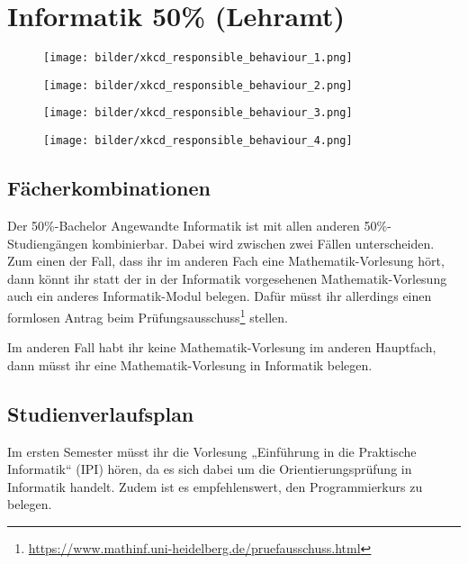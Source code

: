 \section{Informatik 50\% (Lehramt)}

\begin{figure*}[t]
    \centering
    \begin{subfigure}{.24\textwidth}
    		\centering
		\texttt{[image: bilder/xkcd\_responsible\_behaviour\_1.png]}
    \end{subfigure}
    \begin{subfigure}{.24\textwidth}
	    \centering
	    \texttt{[image: bilder/xkcd\_responsible\_behaviour\_2.png]}
    \end{subfigure}
    \begin{subfigure}{.25\textwidth}
	    \centering
	    \texttt{[image: bilder/xkcd\_responsible\_behaviour\_3.png]}
    \end{subfigure}
    \begin{subfigure}{.25\textwidth}
	    \centering
	    \texttt{[image: bilder/xkcd\_responsible\_behaviour\_4.png]}
    \end{subfigure}
\end{figure*}

\subsection{Fächerkombinationen}
Der 50\%-Bachelor Angewandte Informatik ist mit allen anderen 50\%-Studiengängen kombinierbar. Dabei wird zwischen zwei Fällen unterscheiden. Zum einen der Fall, dass ihr im anderen Fach eine Mathematik-Vorlesung hört, dann könnt ihr statt der in der Informatik vorgesehenen Mathematik-Vorlesung auch ein anderes Informatik-Modul belegen. Dafür müsst ihr allerdings einen formlosen Antrag beim Prüfungsausschuss\footnote{\url{https://www.mathinf.uni-heidelberg.de/pruefausschuss.html}} stellen. 

Im anderen Fall habt ihr keine Mathematik-Vorlesung im anderen Hauptfach, dann müsst ihr eine Mathematik-Vorlesung in Informatik belegen.

\subsection{Studienverlaufsplan}
Im ersten Semester müsst ihr die Vorlesung „Einführung in die Praktische Informatik“ (\gls{IPI}) hören, da es sich dabei um die Orientierungsprüfung in Informatik handelt. Zudem ist es empfehlenswert, den Programmierkurs zu belegen. 

